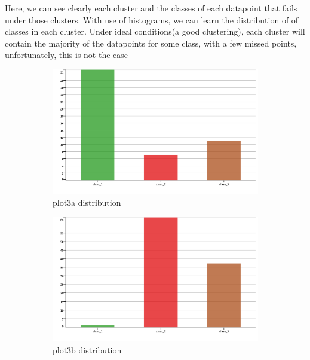 \documentclass[12pt]{article}
\begin{document}
		Here, we can see clearly each cluster and the classes of each datapoint that fails under those clusters. With use of histograms, we can learn the distribution of of classes in each cluster. Under ideal conditions(a good clustering), each cluster will contain the majority of the datapoints for some class, with a few missed points, unfortunately, this is not the case
		\begin{figure}[H]
			\centering
			\begin{subfigure}{0.4\textwidth}
				\includegraphics[width=\textwidth]{res/plot3adist}
				\caption{plot3a distribution}
				\label{fig:first}
			\end{subfigure}
			\hfill
			\begin{subfigure}{0.4\textwidth}
				\includegraphics[width=\textwidth]{res/plot3bdist}
				\caption{plot3b distribution}
				\label{fig:second}
			\end{subfigure}
			\hfill
			\begin{subfigure}{0.4\textwidth}

\end{subfigure}
\end{figure}
\end{document}
